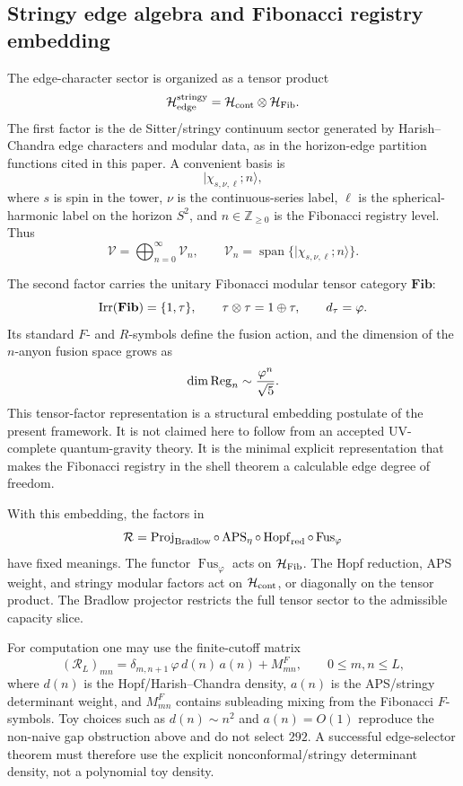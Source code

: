 \documentclass[aps,prd,reprint,nofootinbib,superscriptaddress,floatfix]{revtex4-2}
\numberwithin{equation}{section}
\theoremstyle{definition}
\theoremstyle{plain}
\begin{document}
\subsection{Stringy edge algebra and Fibonacci registry embedding}

The edge-character sector is organized as a tensor product
\[
\mathcal H_{\rm edge}^{\rm stringy}
=
\mathcal H_{\rm cont}
\otimes
\mathcal H_{\rm Fib}.
\]
The first factor is the de Sitter/stringy continuum sector generated by
Harish--Chandra edge characters and modular data, as in the horizon-edge
partition functions cited in this paper.  A convenient basis is
\[
|\chi_{s,\nu,\ell};n\rangle ,
\]
where \(s\) is spin in the tower, \(\nu\) is the continuous-series label,
\(\ell\) is the spherical-harmonic label on the horizon \(S^2\), and
\(n\in\mathbb Z_{\ge0}\) is the Fibonacci registry level.  Thus
\[
\mathcal V=\bigoplus_{n=0}^{\infty}\mathcal V_n,
\qquad
\mathcal V_n=\operatorname{span}\{|\chi_{s,\nu,\ell};n\rangle\}.
\]

The second factor carries the unitary Fibonacci modular tensor category
\(\mathbf{Fib}\):
\[
{\rm Irr}(\mathbf{Fib})=\{1,\tau\},\qquad
\tau\otimes\tau=1\oplus\tau,\qquad
d_\tau=\varphi .
\]
Its standard \(F\)- and \(R\)-symbols define the fusion action, and the
dimension of the \(n\)-anyon fusion space grows as
\[
\dim{\rm Reg}_n\sim \frac{\varphi^n}{\sqrt5}.
\]
This tensor-factor representation is a structural embedding postulate of the
present framework.  It is not claimed here to follow from an accepted
UV-complete quantum-gravity theory.  It is the minimal explicit representation
that makes the Fibonacci registry in the shell theorem a calculable edge
degree of freedom.

With this embedding, the factors in
\[
\mathcal R
=
\operatorname{Proj}_{\rm Bradlow}
\circ
\operatorname{APS}_{\eta}
\circ
\operatorname{Hopf}_{\rm red}
\circ
\operatorname{Fus}_{\varphi}
\]
have fixed meanings.  The functor \(\operatorname{Fus}_{\varphi}\) acts on
\(\mathcal H_{\rm Fib}\).  The Hopf reduction, APS weight, and stringy modular
factors act on \(\mathcal H_{\rm cont}\), or diagonally on the tensor product.
The Bradlow projector restricts the full tensor sector to the admissible
capacity slice.

For computation one may use the finite-cutoff matrix
\[
(\mathcal R_L)_{mn}
=
\delta_{m,n+1}\,
\varphi\,d(n)\,a(n)
+
M^{F}_{mn},
\qquad
0\le m,n\le L,
\]
where \(d(n)\) is the Hopf/Harish--Chandra density, \(a(n)\) is the
APS/stringy determinant weight, and \(M^F_{mn}\) contains subleading mixing
from the Fibonacci \(F\)-symbols.  Toy choices such as \(d(n)\sim n^2\) and
\(a(n)=O(1)\) reproduce the non-naive gap obstruction above and do not select
\(292\).  A successful edge-selector theorem must therefore use the explicit
nonconformal/stringy determinant density, not a polynomial toy density.
\end{document}
